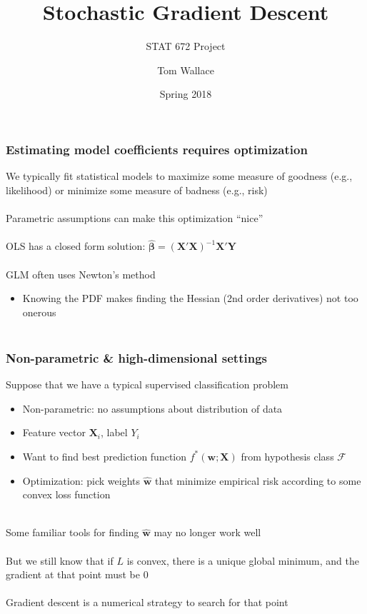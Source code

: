 \documentclass{beamer}
\title{Stochastic Gradient Descent}
\subtitle{STAT 672 Project}
\author{Tom Wallace}
\institute{George Mason University}
\date{Spring 2018}
\begin{document}
\frame{\titlepage}


\begin{frame}
	\frametitle{Estimating model coefficients requires optimization}
	We typically fit statistical models to maximize some measure of goodness
	(e.g., likelihood) or minimize some measure of badness (e.g., risk)
	\\~\\

	Parametric assumptions can make this optimization ``nice'' \\~\\

	OLS has a closed form solution: $\hat{\bm{\beta}} =
	(\bm{X}'\bm{X})^{-1}\bm{X}'\bm{Y}$ \\~\\

	GLM often uses Newton's method
	\begin{itemize}
		\item \small Knowing the PDF makes finding the
			Hessian (2nd order derivatives) not too onerous \\~\\
	\end{itemize}

\end{frame}

\begin{frame}
	\frametitle{Non-parametric \& high-dimensional settings}
	Suppose that we have a typical supervised classification problem
	\begin{itemize}
		\item \small Non-parametric: no assumptions about distribution of data
		\item Feature vector $\mathbf{X}_i$, label $Y_i$
		\item Want to find best prediction function $f^*(\bm{w}; \bm{X})$ from
			hypothesis class $\mathcal{F}$
		\item Optimization: pick weights $\hat{\bm{w}}$ that minimize
			empirical risk according to some convex
			loss function \\~\\
	\end{itemize}

	Some familiar tools for finding $\hat{\mathbf{w}}$ may no longer work well
	\\~\\

	But we still know that if $L$ is convex, there is a unique global
	minimum, and the gradient at that point must be 0 \\~\\

	Gradient descent is a numerical strategy to search for that point
\end{frame}
\end{document}

